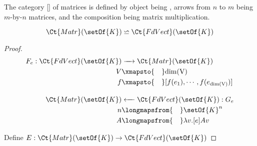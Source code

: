 
\begin{Def}
The category [] of matrices is defined by object being , arrows from $n$ to $m$ being $m$-by-$n$ matrices, and the composition being matrix multiplication.
\end{Def}

\begin{Th}
\begin{equation}
    \Ct{Matr}(\setOf{K}) \backsimeq \Ct{FdVect}(\setOf{K})
\end{equation}
\end{Th}
\begin{proof}

\begin{alignat}{3}
F_e : \Ct{FdVect}(\setOf{K})& \xrightarrow{\quad} 
\Ct{Matr}(\setOf{K}) \\
V& \xmapsto{\quad} \rm{dim}(V) \\
f& \xmapsto{\quad} [f(e_1), \cdots, f(e_{\rm{dim}(V)}) ] \\[1em]
\Ct{Matr}(\setOf{K})& \xleftarrow{\quad} \Ct{FdVect}(\setOf{K}) : G_e\\
n& \longmapsfrom{\quad} \setOf{K}^n \\
A& \longmapsfrom{\quad} \lambda v . [e]Av
\end{alignat}

Define $E : \Ct{Matr}(\setOf{K}) \to \Ct{FdVect}(\setOf{K})$

\end{proof}

